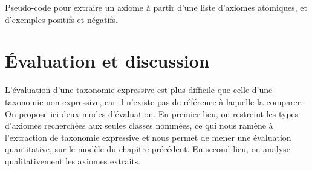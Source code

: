 {\begin{algorithm}[h]
 \caption{Pseudo-code pour extraire un axiome à partir d'une liste d'axiomes atomiques, et d'exemples positifs et négatifs.}
 \label{algo:extraction}
\end{algorithm}

} 
\fi

\iffalse {
\subsubsection{Détails pratiques}

Axiomes vus comme des vecteurs bo   oléens. Le tout est vu comme une matrice booléenne, opérations rapides sur les lignes et les columns

Expliquer la traduction matricielle de $\cov, \spe, \xscore \ldots$


\subsection{Algorithme général}
\subsubsection{Vue d'ensemble}

Extraction de taxonomie à partir des axiomes

Choix des seuils

Discussion sur les paramètres

\subsubsection{Diminution du seuil}


\subsubsection{Phase finale}

Phase finale : ajout des classes manquantes (si disponible), restriction des patterns}
\fi 

\FloatBarrier

\section{Évaluation et discussion}
\label{sec:texp-results}

L'évaluation d'une taxonomie expressive est plus difficile
que celle d'une taxonomie non-expressive, car il n'existe pas de référence à laquelle la comparer. On propose ici deux modes d'évaluation. En premier lieu, on restreint les types d'axiomes recherchées aux seules classes nommées, ce qui nous ramène à l'extraction de taxonomie expressive et nous permet de mener une évaluation quantitative, sur le modèle du chapitre précédent. %
En second lieu, on analyse qualitativement les axiomes extraits.



